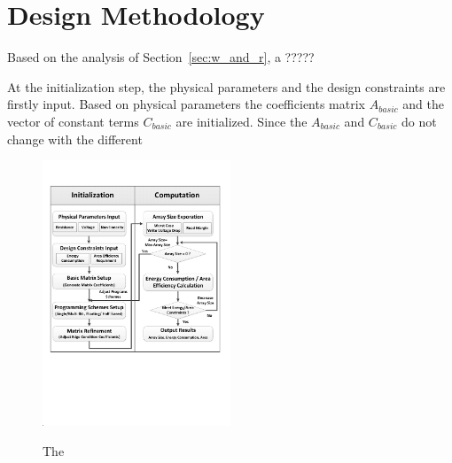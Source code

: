 \vspace{10pt}
\section{Design Methodology}\label{sec:framwork}
Based on the analysis of Section~\ref{sec:w_and_r}, a ?????

At the initialization step, the physical parameters and the design constraints are firstly input. Based on physical parameters the coefficients matrix $A_{basic}$ and the vector of constant terms $C_{basic}$ are initialized. Since the $A_{basic}$ and $C_{basic}$ do not change with the different

\begin{figure}[!t]
\centering
  \includegraphics[width=0.5\textwidth]{./figures/FlowChart.pdf}\\
  \caption{The}\label{fig:FlowChart}
\end{figure}
